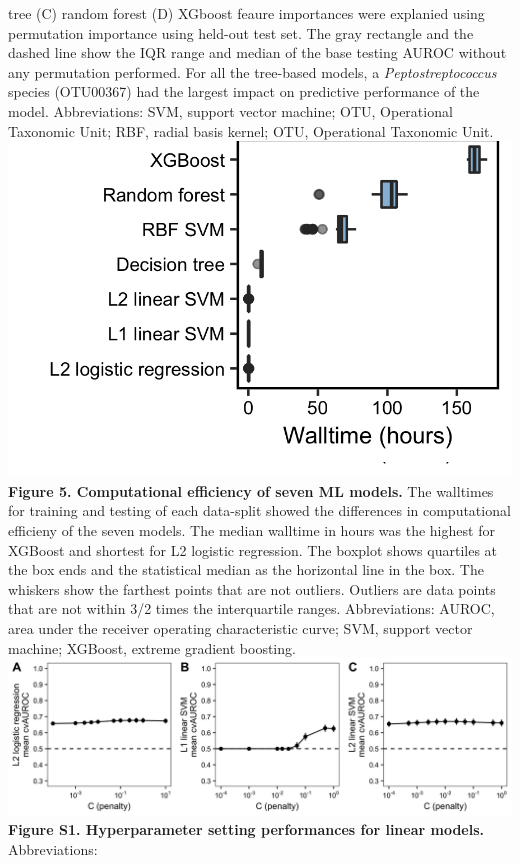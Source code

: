 \documentclass[11pt,]{article}
\begin{document}
tree (C) random forest (D) XGboost feaure importances were explanied
using permutation importance using held-out test set. The gray rectangle
and the dashed line show the IQR range and median of the base testing
AUROC without any permutation performed. For all the tree-based models,
a \emph{Peptostreptococcus} species (OTU00367) had the largest impact on
predictive performance of the model. Abbreviations: SVM, support vector
machine; OTU, Operational Taxonomic Unit; RBF, radial basis kernel; OTU,
Operational Taxonomic Unit. \newpage
\includegraphics{Figure_5.png} \textbf{Figure 5. Computational
efficiency of seven ML models.} The walltimes for training and testing
of each data-split showed the differences in computational efficieny of
the seven models. The median walltime in hours was the highest for
XGBoost and shortest for L2 logistic regression. The boxplot shows
quartiles at the box ends and the statistical median as the horizontal
line in the box. The whiskers show the farthest points that are not
outliers. Outliers are data points that are not within 3/2 times the
interquartile ranges. Abbreviations: AUROC, area under the receiver
operating characteristic curve; SVM, support vector machine; XGBoost,
extreme gradient boosting.\\
\newpage
\includegraphics{Figure_S1.png} \textbf{Figure S1. Hyperparameter
setting performances for linear models.} Abbreviations: \newpage
\end{document}
